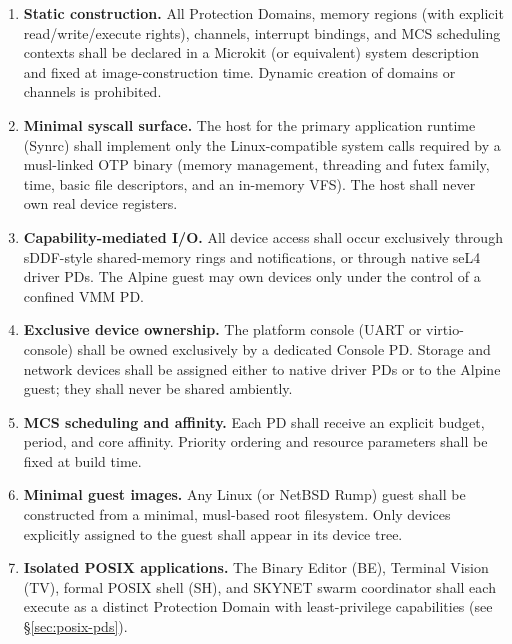 \documentclass{article}
\begin{document}
\begin{enumerate}[leftmargin=*,label=\textbf{TR-\arabic*}]
  \item \textbf{Static construction.}  
        All Protection Domains, memory regions (with explicit read/write/execute
        rights), channels, interrupt bindings, and MCS scheduling contexts shall
        be declared in a Microkit (or equivalent) system description and fixed at
        image-construction time. Dynamic creation of domains or channels is
        prohibited.

  \item \textbf{Minimal syscall surface.}  
        The host for the primary application runtime (Synrc) shall implement only
        the Linux-compatible system calls required by a musl-linked OTP binary
        (memory management, threading and futex family, time, basic file
        descriptors, and an in-memory VFS). The host shall never own real device
        registers.

  \item \textbf{Capability-mediated I/O.}  
        All device access shall occur exclusively through sDDF-style shared-memory
        rings and notifications, or through native seL4 driver PDs. The Alpine
        guest may own devices only under the control of a confined VMM PD.

  \item \textbf{Exclusive device ownership.}  
        The platform console (UART or virtio-console) shall be owned exclusively
        by a dedicated Console PD. Storage and network devices shall be assigned
        either to native driver PDs or to the Alpine guest; they shall never be
        shared ambiently.

  \item \textbf{MCS scheduling and affinity.}  
        Each PD shall receive an explicit budget, period, and core affinity.
        Priority ordering and resource parameters shall be fixed at build time.

  \item \textbf{Minimal guest images.}  
        Any Linux (or NetBSD Rump) guest shall be constructed from a minimal,
        musl-based root filesystem. Only devices explicitly assigned to the guest
        shall appear in its device tree.

  \item \textbf{Isolated POSIX applications.}  
        The Binary Editor (BE), Terminal Vision (TV), formal POSIX shell (SH),
        and SKYNET swarm coordinator shall each execute as a distinct Protection
        Domain with least-privilege capabilities (see \S\ref{sec:posix-pds}).


\end{enumerate}
\end{document}
